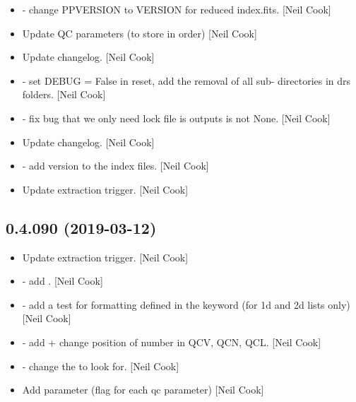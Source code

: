 \documentclass[a4paper,10pt,english]{report}
\begin{document}
\begin{itemize}
\item {} 
 - change PPVERSION to VERSION for reduced index.fits.
{[}Neil Cook{]}

\item {} 
Update QC parameters (to store in order) {[}Neil Cook{]}

\item {} 
Update changelog. {[}Neil Cook{]}

\item {} 
 - set DEBUG = False in reset, add the removal of all sub-
directories in drs folders. {[}Neil Cook{]}

\item {} 
 - fix bug that we only need lock file is outputs is
not None. {[}Neil Cook{]}

\item {} 
Update changelog. {[}Neil Cook{]}

\item {} 
 - add version to the index files. {[}Neil Cook{]}

\item {} 
Update extraction trigger. {[}Neil Cook{]}

\end{itemize}


\subsection{0.4.090 (2019-03-12)}
\label{\detokenize{misc/changelog:id170}}\begin{itemize}
\item {} 
Update extraction trigger. {[}Neil Cook{]}

\item {} 
 - add . {[}Neil Cook{]}

\item {} 
 - add a test for formatting defined in the keyword (for
1d and 2d lists only) {[}Neil Cook{]}

\item {} 
 - add  + change position of number in
QCV, QCN, QCL. {[}Neil Cook{]}

\item {} 
 - change the  to look for. {[}Neil Cook{]}

\item {} 
Add  parameter (flag for each qc parameter) {[}Neil Cook{]}

\end{itemize}
\end{document}
